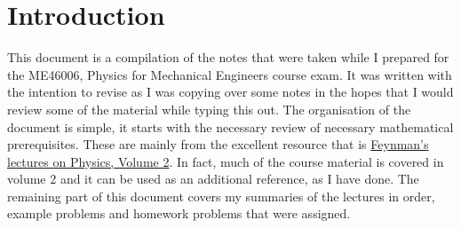 \section{Introduction}
This document is a compilation of the notes that were taken while I prepared for the ME46006, Physics for Mechanical Engineers course exam. It was written with the intention to revise as I was copying over some notes in the hopes that I would review some of the material while typing this out. The organisation of the document is simple, it starts with the necessary review of necessary mathematical prerequisites. These are mainly from the excellent resource that is \href{https://www.feynmanlectures.caltech.edu/II_toc.html}{Feynman's lectures on Physics, Volume 2}. In fact, much of the course material is covered in volume 2 and it can be used as an additional reference, as I have done. The remaining part of this document covers my summaries of the lectures in order, example problems and homework problems that were assigned.
